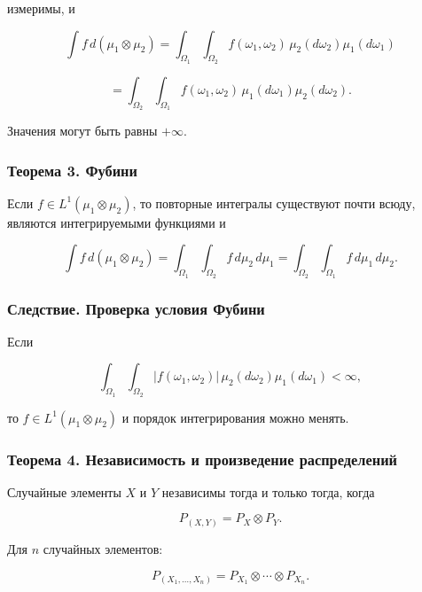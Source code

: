 \documentclass[
  11pt,
  a4paper,
]{article}
\begin{document}
измеримы, и

\[
\int f\,d(\mu_1\otimes\mu_2)
=
\int_{\Omega_1}\int_{\Omega_2}f(\omega_1,\omega_2)\,\mu_2(d\omega_2)\mu_1(d\omega_1)
\]

\[
=
\int_{\Omega_2}\int_{\Omega_1}f(\omega_1,\omega_2)\,\mu_1(d\omega_1)\mu_2(d\omega_2).
\]

Значения могут быть равны \(+\infty\).

\subsubsection{Теорема 3.
Фубини}\label{ux442ux435ux43eux440ux435ux43cux430-3.-ux444ux443ux431ux438ux43dux438}

Если \(f\in L^1(\mu_1\otimes\mu_2)\), то повторные интегралы существуют
почти всюду, являются интегрируемыми функциями и

\[
\int f\,d(\mu_1\otimes\mu_2)
=
\int_{\Omega_1}\int_{\Omega_2}f\,d\mu_2\,d\mu_1
=
\int_{\Omega_2}\int_{\Omega_1}f\,d\mu_1\,d\mu_2.
\]

\subsubsection{Следствие. Проверка условия
Фубини}\label{ux441ux43bux435ux434ux441ux442ux432ux438ux435.-ux43fux440ux43eux432ux435ux440ux43aux430-ux443ux441ux43bux43eux432ux438ux44f-ux444ux443ux431ux438ux43dux438}

Если

\[
\int_{\Omega_1}\int_{\Omega_2}|f(\omega_1,\omega_2)|\,\mu_2(d\omega_2)\mu_1(d\omega_1)<\infty,
\]

то \(f\in L^1(\mu_1\otimes\mu_2)\) и порядок интегрирования можно
менять.

\subsubsection{Теорема 4. Независимость и произведение
распределений}\label{ux442ux435ux43eux440ux435ux43cux430-4.-ux43dux435ux437ux430ux432ux438ux441ux438ux43cux43eux441ux442ux44c-ux438-ux43fux440ux43eux438ux437ux432ux435ux434ux435ux43dux438ux435-ux440ux430ux441ux43fux440ux435ux434ux435ux43bux435ux43dux438ux439}

Случайные элементы \(X\) и \(Y\) независимы тогда и только тогда, когда

\[
P_{(X,Y)}=P_X\otimes P_Y.
\]

Для \(n\) случайных элементов:

\[
P_{(X_1,\ldots,X_n)}
=
P_{X_1}\otimes\cdots\otimes P_{X_n}.
\]
\end{document}
